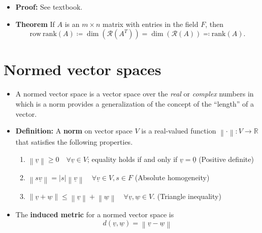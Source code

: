 \documentclass[11pt,twoside]{report}
\newcommand{\bbR}{{\mathbb{R}}}
\newcommand{\vecnot}{\underline}
\newcommand{\Rank}{\mathrm{rank}}
\begin{document}
\begin{itemize}
\item \textbf{Proof:}  See textbook. 



\item \textbf{Theorem}
If $A$ is an $m \times n$ matrix with entries in the field $F$, then 
\begin{equation*} 
\mathrm{row~rank} (A) \coloneqq \dim( \mathcal{R}(A^T)) =  \dim( \mathcal{R}(A))\eqqcolon \Rank (A).
\end{equation*}




\end{itemize}


\section{Normed vector spaces} 



\begin{itemize}

\item A normed vector space is a vector space over the \emph{real} or \emph{complex} numbers in which is a norm provides a generalization of the concept of the ``length'' of a vector. 

\item \textbf{Definition:} 
A \textbf{norm} on vector space $V$ is a real-valued function $\left\| \cdot \right\| \colon V \rightarrow \bbR$ that satisfies the following properties.
\begin{enumerate}
\item $\left\| \vecnot{v} \right\| \geq 0 \quad \forall \vecnot{v} \in V$;
equality holds if and only if $\vecnot{v} = \vecnot{0}$ \hfill (Positive definite)
\item $\left\| s \vecnot{v} \right\| = |s| \left\| \vecnot{v} \right\| \quad \forall \vecnot{v} \in V, s \in F$ \hfill (Absolute homogeneity)
\item $\left\| \vecnot{v} + \vecnot{w} \right\| \leq  
\left\| \vecnot{v} \right\| + \left\| \vecnot{w} \right\| \quad \forall \vecnot{v}, \vecnot{w} \in V$. \hfill (Triangle inequality)
\end{enumerate}


\item The \textbf{induced metric} for a normed vector space is 
\[
d \left( \vecnot{v}, \vecnot{w} \right)
= \left\| \vecnot{v} - \vecnot{w} \right\|
\]


\end{itemize}
\end{document}
